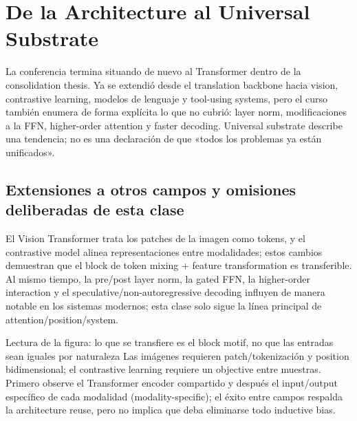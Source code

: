\section{De la Architecture al Universal Substrate}

La conferencia termina situando de nuevo al Transformer dentro de la consolidation thesis. Ya se extendió desde el translation backbone hacia vision, contrastive learning, modelos de lenguaje y tool-using systems, pero el curso también enumera de forma explícita lo que no cubrió: layer norm, modificaciones a la FFN, higher-order attention y faster decoding. Universal substrate describe una tendencia; no es una declaración de que «todos los problemas ya están unificados».

\subsection{Extensiones a otros campos y omisiones deliberadas de esta clase}

El Vision Transformer trata los patches de la imagen como tokens, y el contrastive model alinea representaciones entre modalidades; estos cambios demuestran que el block de token mixing + feature transformation es transferible. Al mismo tiempo, la pre/post layer norm, la gated FFN, la higher-order interaction y el speculative/non-autoregressive decoding influyen de manera notable en los sistemas modernos; esta clase solo sigue la línea principal de attention/position/system.


\begin{knowledgebox}{Lectura de la figura: lo que se transfiere es el block motif, no que las entradas sean iguales por naturaleza}
Las imágenes requieren patch/tokenización y position bidimensional; el contrastive learning requiere un objective entre muestras. Primero observe el Transformer encoder compartido y después el input/output específico de cada modalidad (modality-specific); el éxito entre campos respalda la architecture reuse, pero no implica que deba eliminarse todo inductive bias.
\end{knowledgebox}



